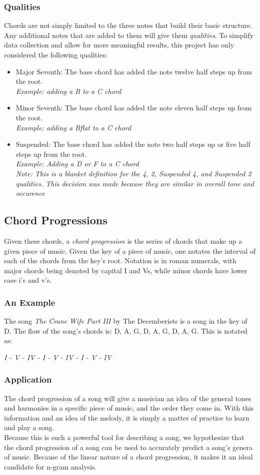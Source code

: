 \documentclass{article}
\begin{document}
\subsubsection{Qualities}
Chords are not simply limited to the three notes that build their basic structure.  Any additional notes that are added to them will give them \emph{qualities}.  To simplify data collection and allow for more meaningful results, this project has only considered the following qualities:
\begin{itemize}
	\item Major Seventh:  The base chord has added the note twelve half steps up from the root.\\  \emph{Example:  adding a B to a C chord}
	\item Minor Seventh:  The base chord has added the note eleven half steps up from the root.\\  \emph{Example:  adding a Bflat to a C chord}
	\item Suspended:  The base chord has added the note two half steps up or five half steps up from the root. \\  \emph{Example:  Adding a D or F to a C chord}\\\emph{Note:  This is a blanket definition for the 4, 2, Suspended 4, and Suspended 2 qualities.  This decision was made because they are similar in overall tone and occurence}
\end{itemize}
\subsection{Chord Progressions}
Given these chords, a \emph{chord progression} is the series of chords that make up a given piece of music.  Given the key of a piece of music, one notates the interval of each of the chords from the key's root.  Notation is in roman numerals, with major chords being denoted by capital I and Vs, while minor chords have lower case i's and v's.
\subsubsection{An Example}
The song \emph{The Crane Wife Part III} by The Decemberists is a song in the key of D.  The flow of the song's chords is:  D, A, G, D, A, G, D, A, G.  This is notated as:\\
\begin{center}
\emph{I - V - IV - I - V - IV - I - V - IV}
\end{center}
\subsubsection{Application}
The chord progression of a song will give a musician an idea of the general tones and harmonies in a specific piece of music, and the order they come in.  With this information and an idea of the melody, it is simply a matter of practice to learn and play a song.\\
Because this is such a powerful tool for describing a song, we hypothesize that the chord progression of a song can be used to accurately predict a song's genera of music.  Because of the linear nature of a chord progression, it makes it an ideal candidate for n-gram analysis.
  
\end{document}
